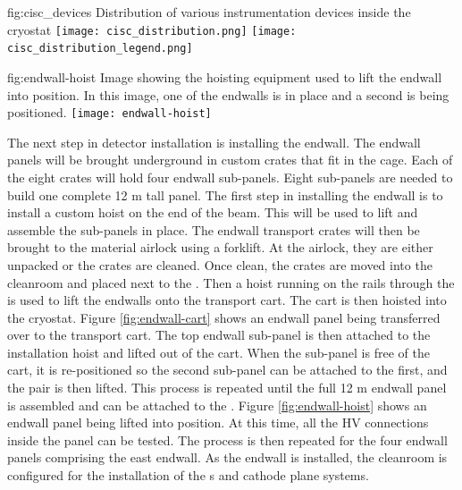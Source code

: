 \begin{dunefigure}{fig:cisc_devices}
  {Distribution of various instrumentation devices inside the cryostat}
  \texttt{[image: cisc\_distribution.png]}
  \texttt{[image: cisc\_distribution\_legend.png]}
\end{dunefigure}

\begin{dunefigure}{fig:endwall-hoist}
  {Image showing the hoisting equipment used to lift the endwall into position. In this image, one of the endwalls is in place and a second is being positioned.}
\texttt{[image: endwall-hoist]}
\end{dunefigure}

The next step in detector installation is installing the  endwall. 
The endwall panels will be brought underground in custom crates that fit in the cage. 
Each of the eight crates will hold four endwall sub-panels. Eight sub-panels are needed to build one complete 12 \si{m} tall panel.  
The first step in installing the endwall is to install a custom hoist on the end of the  beam. 
This will be used to lift and assemble the sub-panels in place. 
The endwall transport crates will then be brought to the material airlock using a forklift. At the airlock, they are either unpacked or the crates are cleaned. 
Once clean, the crates are moved into the cleanroom and placed next to the . Then a hoist running on the rails through the  is used to lift the endwalls  onto the transport cart. The cart is then hoisted into the cryostat. 
Figure \ref{fig:endwall-cart} shows an endwall panel being transferred over to the transport cart.
The top endwall sub-panel is then attached to the installation hoist and lifted out of the cart. When the sub-panel is free of  the cart, it is re-positioned so the second sub-panel can be attached to the first, and the pair is then lifted. This process is repeated until the full 12 \si{m} endwall  panel is assembled and can be attached to the . 
Figure \ref{fig:endwall-hoist} shows an endwall panel being lifted into position.
At this time, all the HV connections inside the panel can be tested. The process is then repeated for the four endwall panels comprising the east endwall. 
As the endwall is installed, the cleanroom is configured for the installation of the s and cathode plane systems. 

